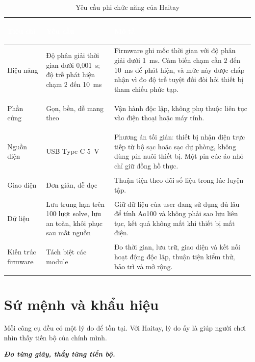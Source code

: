\begin{table}[htbp]
    \centering
    \renewcommand{\arraystretch}{1.5}
    \caption{Yêu cầu phi chức năng của Haitay}
    \label{tab:nfr}
    \begin{tabular}{>{\bfseries\raggedright\arraybackslash}m{3.2cm} >{\raggedright\arraybackslash}m{3.3cm} >{\raggedright\arraybackslash}m{7.6cm}}
        \toprule
        \rowcolor{haitayblue}
        \textcolor{white}{Tiêu chí} & \textcolor{white}{Yêu cầu} & \textcolor{white}{Mô tả} \\
        \midrule
        \rowcolor{haitayblue!8}
        Hiệu năng & Độ phân giải thời gian dưới 0,001~s; độ trễ phát hiện chạm 2 đến 10~ms & Firmware ghi mốc thời gian với độ phân giải dưới 1~ms. Cảm biến chạm cần 2 đến 10~ms để phát hiện, và mức này được chấp nhận vì đo độ trễ tuyệt đối đòi hỏi thiết bị tham chiếu phức tạp. \\
        Phần cứng & Gọn, bền, dễ mang theo & Vận hành độc lập, không phụ thuộc liên tục vào điện thoại hoặc máy tính. \\
        \rowcolor{haitayblue!8}
        Nguồn điện & USB Type-C 5~V & Phương án tối giản: thiết bị nhận điện trực tiếp từ bộ sạc hoặc sạc dự phòng, không dùng pin nuôi thiết bị. Một pin cúc áo nhỏ chỉ giữ đồng hồ thực. \\
        Giao diện & Đơn giản, dễ đọc & Thuận tiện theo dõi số liệu trong lúc luyện tập. \\
        \rowcolor{haitayblue!8}
        Dữ liệu & Lưu trung hạn trên 100 lượt solve, lưu an toàn, khôi phục sau mất nguồn & Giữ dữ liệu của user đang sử dụng đủ lâu để tính Ao100 và không phải sao lưu liên tục, kết quả không mất khi thiết bị mất điện. \\
        Kiến trúc firmware & Tách biệt các module & Đo thời gian, lưu trữ, giao diện và kết nối hoạt động độc lập, thuận tiện kiểm thử, bảo trì và mở rộng. \\
        \bottomrule
    \end{tabular}
\end{table}


\section{Sứ mệnh và khẩu hiệu}
Mỗi công cụ đều có một lý do để tồn tại. Với Haitay, lý do ấy là giúp người chơi nhìn thấy tiến bộ của chính mình.

\begin{tcolorbox}[
    colback=haitayblue!8,
    colframe=haitayblue,
    arc=4pt,
    boxrule=0.8pt,
    halign=center,
    valign=center
]
    {\Large\bfseries\itshape\color{haitayblue} Đo từng giây, thấy từng tiến bộ.}
\end{tcolorbox}

